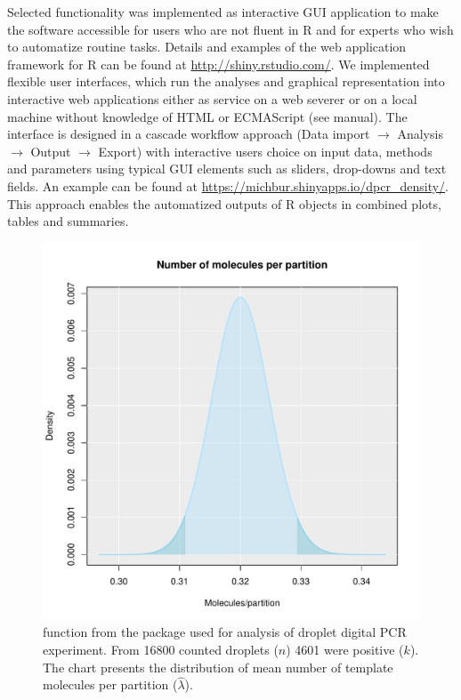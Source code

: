 Selected functionality was implemented as interactive  GUI 
application to make the software accessible for users who are not fluent in R 
and for experts who wish to automatize routine tasks. Details and examples of 
the  web application framework for R can be found at 
\url{http://shiny.rstudio.com/}. We implemented 
flexible user interfaces, which run the analyses and graphical representation 
into interactive web applications either as service on a web severer or on a 
local machine without knowledge of HTML or ECMAScript (see  
manual). The interface is designed in a cascade workflow approach (Data import 
$\rightarrow$ Analysis $\rightarrow$ Output $\rightarrow$ Export) with 
interactive users choice on input data, methods and parameters using typical GUI 
elements such as sliders, drop-downs and text fields. An example can be found at 
\url{https://michbur.shinyapps.io/dpcr_density/}. This approach enables the 
automatized outputs of R objects in combined plots, tables and summaries.

\begin{figure}[htbp]
  \centering
  \includegraphics[clip=true, width=14cm]{figures/dpcR.pdf}
  \caption{ function from the  package used 
for analysis of droplet digital PCR experiment. From 16800 counted droplets 
($n$) 4601 were positive ($k$). The chart presents the distribution of mean number of 
template molecules per partition ($\hat \lambda$). 
}
  \label{figure:dpcR}
\end{figure}

